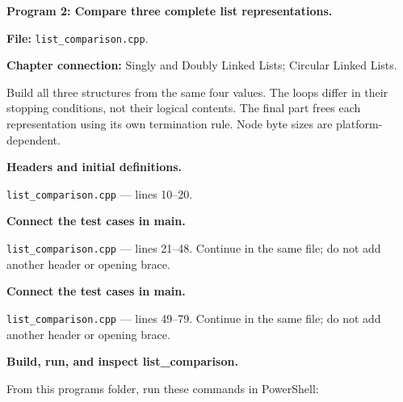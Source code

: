\textbf{Program 2: Compare three complete list representations.}

\textbf{File:} \texttt{list\_comparison.cpp}.

\textbf{Chapter connection:} Singly and Doubly Linked Lists; Circular Linked Lists.

Build all three structures from the same four values. The loops differ in their stopping conditions, not their logical contents. The final part frees each representation using its own termination rule. Node byte sizes are platform-dependent.



\begin{utpsteps}\setcounter{enumi}{0}\item \textbf{Headers and initial definitions.}\end{utpsteps}

\texttt{list\_comparison.cpp} --- lines 10--20.




\tcbbreak

\begin{utpsteps}\setcounter{enumi}{1}\item \textbf{Connect the test cases in main.}\end{utpsteps}

\texttt{list\_comparison.cpp} --- lines 21--48. Continue in the same file; do not add another header or opening brace.






\tcbbreak

\begin{utpsteps}\setcounter{enumi}{2}\item \textbf{Connect the test cases in main.}\end{utpsteps}

\texttt{list\_comparison.cpp} --- lines 49--79. Continue in the same file; do not add another header or opening brace.




\tcbbreak

\textbf{Build, run, and inspect list\_comparison.}

From this program\textquotesingle s folder, run these commands in PowerShell:

